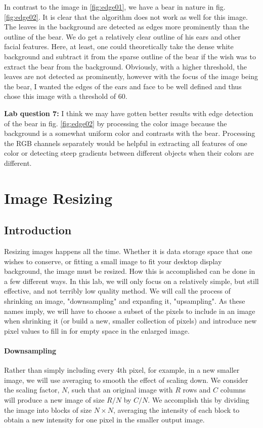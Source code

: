 \documentclass[11pt,a4paper]{article}
\begin{document}
In contrast to the image in \ref{fig:edge01}, we have a bear in nature in fig. \ref{fig:edge02}. It is clear that the algorithm does not work as well for this image. The leaves in the background are detected as edges more prominently than the outline of the bear. We do get a relatively clear outline of his ears and other facial features. Here, at least, one could theoretically take the dense white background and subtract it from the sparse outline of the bear if the wish was to extract the bear from the background. Obviously, with a higher threshold, the leaves are not detected as prominently, however with the focus of the image being the bear, I wanted the edges of the ears and face to be well defined and thus chose this image with a threshold of 60.

\textbf{Lab question 7:} I think we may have gotten better results with edge detection of the bear in fig. \ref{fig:edge02} by processing the color image because the background is a somewhat uniform color and contrasts with the bear. Processing the RGB channels separately would be helpful in extracting all features of one color or detecting steep gradients between different objects when their colors are different.

\pagebreak

\section{Image Resizing}

\subsection{Introduction}
Resizing images happens all the time. Whether it is data storage space that one wishes to conserve, or fitting a small image to fit your desktop display background, the image must be resized. How this is accomplished can be done in a few different ways. In this lab, we will only focus on a relatively simple, but still effective, and not terribly low quality method. We will call the process of shrinking an image, "downsampling" and expanfing it, "upsampling". As these names imply, we will have to choose a subset of the pixels to include in an image when shrinking it (or build a new, smaller collection of pixels) and introduce new pixel values to fill in for empty space in the enlarged image.

\paragraph{Downsampling} Rather than simply including every 4th pixel, for example, in a new smaller image, we will use averaging to smooth the effect of scaling down. We consider the scaling factor, $N$, such that an original image with $R$ rows and $C$ columns will produce a new image of size $R/N$ by $C/N$. We accomplish this by dividing the image into blocks of size $N \times N$, averaging the intensity of each block to obtain a new intensity for one pixel in the smaller output image.
\end{document}
